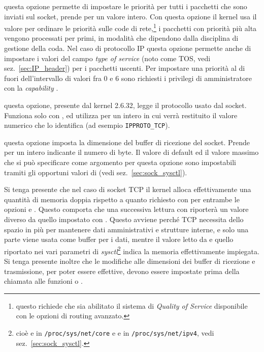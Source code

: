 \begin{basedescript}{\desclabelwidth{2.2cm}\desclabelstyle{\nextlinelabel}}
\item[\constd{SO\_PRIORITY}] questa opzione permette di impostare le priorità
  per tutti i pacchetti che sono inviati sul socket, prende per 
  un valore intero. Con questa opzione il kernel usa il valore per ordinare le
  priorità sulle code di rete,\footnote{questo richiede che sia abilitato il
    sistema di \textit{Quality of Service} disponibile con le opzioni di
    routing avanzato.} i pacchetti con priorità più alta vengono processati
  per primi, in modalità che dipendono dalla disciplina di gestione della
  coda. Nel caso di protocollo IP questa opzione permette anche di impostare i
  valori del campo \textit{type of service} (noto come TOS, vedi
  sez.~\ref{sec:IP_header}) per i pacchetti uscenti. Per impostare una
  priorità al di fuori dell'intervallo di valori fra 0 e 6 sono richiesti i
  privilegi di amministratore con la \textit{capability}
  .

\item[\constd{SO\_PROTOCOL}] questa opzione, presente dal kernel 2.6.32, legge
  il protocollo usato dal socket. Funziona solo con , ed
  utilizza per  un intero in cui verrà restituito il valore
  numerico che lo identifica (ad esempio \texttt{IPPROTO\_TCP}).

\item[\constd{SO\_RCVBUF}] questa opzione imposta la dimensione del buffer di
  ricezione del socket. Prende per  un intero indicante il
  numero di byte. Il valore di default ed il valore massimo che si può
  specificare come argomento per questa opzione sono impostabili tramiti gli
  opportuni valori di  (vedi sez.~\ref{sec:sock_sysctl}).

  Si tenga presente che nel caso di socket TCP il kernel alloca effettivamente
  una quantità di memoria doppia rispetto a quanto richiesto con
   per entrambe le opzioni  e
  . Questo comporta che una successiva lettura con
   riporterà un valore diverso da quello impostato con
  .  Questo avviene perché TCP necessita dello spazio in più
  per mantenere dati amministrativi e strutture interne, e solo una parte
  viene usata come buffer per i dati, mentre il valore letto da
   e quello riportato nei vari parametri di
  \textit{sysctl}\footnote{cioè  e
     in \texttt{/proc/sys/net/core} e
     e 
    in \texttt{/proc/sys/net/ipv4}, vedi sez.~\ref{sec:sock_sysctl}.} indica
  la memoria effettivamente impiegata.  Si tenga presente inoltre che le
  modifiche alle dimensioni dei buffer di ricezione e trasmissione, per poter
  essere effettive, devono essere impostate prima della chiamata alle funzioni
   o .


\end{basedescript}
